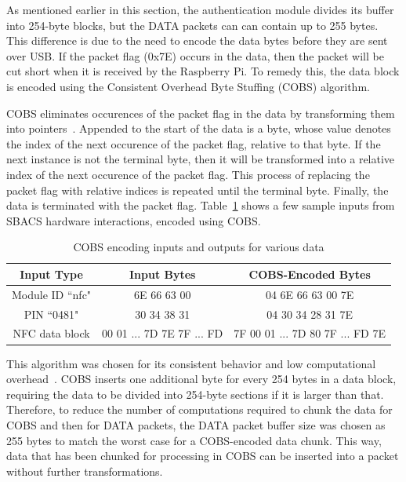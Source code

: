 \documentclass[12pt]{report}
\begin{document}
As mentioned earlier in this section, the authentication module divides its buffer into 254-byte blocks, but the 
DATA packets can can contain up to 255 bytes. This difference is due to the need to encode the data bytes before they
are sent over USB. If the packet flag (0x7E) occurs in the data, then the packet will be cut short when it is received by 
the Raspberry Pi. To remedy this, the data block is encoded using the Consistent Overhead Byte Stuffing (COBS) algorithm.

COBS eliminates occurences of the packet flag in the data by transforming them into pointers~\autocite{COBS}. Appended 
to the start of the data is a byte, whose value denotes the index of the next occurence of the packet flag, relative to 
that byte. If the next instance is not the terminal byte, then it will be transformed into a relative index of the next 
occurence of the packet flag. This process of replacing the packet flag with relative indices is repeated until the 
terminal byte. Finally, the data is terminated with the packet flag. Table~\ref{tab:cobs-encoding} shows a few sample 
inputs from SBACS hardware interactions, encoded using COBS.

\begin{table}[!h]
    \begin{tabular}{|c|c|c|} \hline
        Input Type & Input Bytes & COBS-Encoded Bytes \\ \hline
        Module ID ``nfc" & 6E 66 63 00 & 04 6E 66 63 00 7E \\ \hline
        PIN ``0481" & 30 34 38 31 & 04 30 34 28 31 7E \\ \hline
        NFC data block & 00 01 ... 7D 7E 7F ... FD & 7F 00 01 ... 7D 80 7F ... FD 7E \\ \hline
    \end{tabular}
    \caption{COBS encoding inputs and outputs for various data}
    \label{tab:cobs-encoding}
\end{table}

This algorithm was chosen for its consistent behavior and low computational overhead~\autocite{COBS}. COBS inserts one 
additional byte for every 254 bytes in a data block, requiring the data to be divided into 254-byte sections if it is 
larger than that. Therefore, to reduce the number of computations required to chunk the data for COBS and then for DATA 
packets, the DATA packet buffer size was chosen as 255 bytes to match the worst case for a COBS-encoded data chunk. 
This way, data that has been chunked for processing in COBS can be inserted into a packet without further 
transformations.
\end{document}
